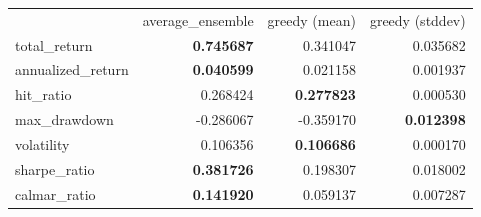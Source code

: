 \begin{tabular}{lrrr}
 & average_ensemble & greedy (mean) & greedy (stddev) \\
total_return & \bfseries 0.745687 & 0.341047 & 0.035682 \\
annualized_return & \bfseries 0.040599 & 0.021158 & 0.001937 \\
hit_ratio & 0.268424 & \bfseries 0.277823 & 0.000530 \\
max_drawdown & -0.286067 & -0.359170 & \bfseries 0.012398 \\
volatility & 0.106356 & \bfseries 0.106686 & 0.000170 \\
sharpe_ratio & \bfseries 0.381726 & 0.198307 & 0.018002 \\
calmar_ratio & \bfseries 0.141920 & 0.059137 & 0.007287 \\
\end{tabular}
